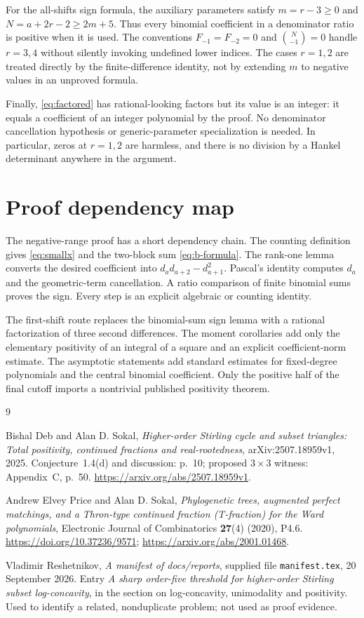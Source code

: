 \documentclass[11pt,a4paper]{article}
\theoremstyle{definition}
\numberwithin{equation}{section}
\begin{document}
For the all-shifts sign formula, the auxiliary parameters satisfy
$m=r-3\ge0$ and $N=a+2r-2\ge2m+5$. Thus every binomial coefficient in a
denominator ratio is positive when it is used. The conventions
$F_{-1}=F_{-2}=0$ and $\binom N{-1}=0$ handle $r=3,4$ without silently
invoking undefined lower indices. The cases $r=1,2$ are treated directly
by the finite-difference identity, not by extending $m$ to negative
values in an unproved formula.

Finally, \eqref{eq:factored} has rational-looking factors but its value
is an integer: it equals a coefficient of an integer polynomial by the
proof. No denominator cancellation hypothesis or generic-parameter
specialization is needed. In particular, zeros at $r=1,2$ are harmless,
and there is no division by a Hankel determinant anywhere in the
argument.

\section{Proof dependency map}

The negative-range proof has a short dependency chain. The counting
definition gives \eqref{eq:smallx} and the two-block sum
\eqref{eq:b-formula}. The rank-one lemma converts the desired coefficient
into $d_ad_{a+2}-d_{a+1}^2$. Pascal's identity computes $d_a$ and the
geometric-term cancellation. A ratio comparison of finite binomial
sums proves the sign. Every step is an explicit algebraic or counting
identity.

The first-shift route replaces the binomial-sum sign lemma with a
rational factorization of three second differences. The moment
corollaries add only the elementary positivity of an integral of a
square and an explicit coefficient-norm estimate. The asymptotic
statements add standard estimates for fixed-degree polynomials and the
central binomial coefficient. Only the positive half of the final
cutoff imports a nontrivial published positivity theorem.

\begin{thebibliography}{9}

Bishal Deb and Alan D. Sokal,
\emph{Higher-order Stirling cycle and subset triangles: Total positivity,
continued fractions and real-rootedness},
arXiv:2507.18959v1, 2025.
Conjecture~1.4(d) and discussion: p.~10;
proposed $3\times3$ witness: Appendix~C, p.~50.
\url{https://arxiv.org/abs/2507.18959v1}.

Andrew Elvey Price and Alan D. Sokal,
\emph{Phylogenetic trees, augmented perfect matchings, and a Thron-type
continued fraction (T-fraction) for the Ward polynomials},
Electronic Journal of Combinatorics \textbf{27}(4) (2020), P4.6.
\url{https://doi.org/10.37236/9571};
\url{https://arxiv.org/abs/2001.01468}.

Vladimir Reshetnikov,
\emph{A manifest of docs/reports}, supplied file \texttt{manifest.tex},
20 September 2026.
Entry \emph{A sharp order-five threshold for higher-order Stirling subset
log-concavity}, in the section on log-concavity, unimodality and
positivity. Used to identify a related, nonduplicate problem; not used
as proof evidence.

\end{thebibliography}
\end{document}
